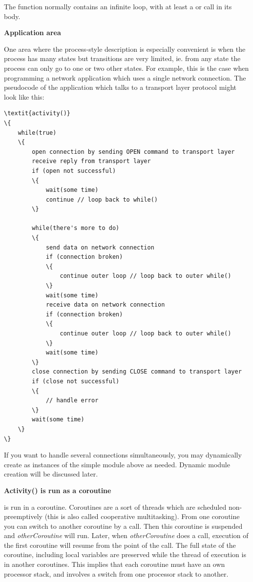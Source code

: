 The  function normally contains an infinite loop,
with at least a  or  call in its body.



\textbf{Application area}


One area where the process-style description is especially convenient is when the process has many
states but transitions are very limited, ie. from any state the
process can only go to one or two other states.  For example, this is
the case when programming a network application which uses a single
network connection.  The pseudocode of the application which talks to
a transport layer protocol might look like this:

\begin{Verbatim}[commandchars=\\\{\}]
\textit{activity()}
\{
    while(true)
    \{
        open connection by sending OPEN command to transport layer
        receive reply from transport layer
        if (open not successful)
        \{
            wait(some time)
            continue // loop back to while()
        \}

        while(there's more to do)
        \{
            send data on network connection
            if (connection broken)
            \{
                continue outer loop // loop back to outer while()
            \}
            wait(some time)
            receive data on network connection
            if (connection broken)
            \{
                continue outer loop // loop back to outer while()
            \}
            wait(some time)
        \}
        close connection by sending CLOSE command to transport layer
        if (close not successful)
        \{
            // handle error
        \}
        wait(some time)
    \}
\}
\end{Verbatim}



If you want to handle several connections simultaneously, you may
dynamically create as instances of the simple
module above as needed. Dynamic module creation will be discussed
later.


\textbf{Activity() is run as a coroutine}


 is run in a coroutine.
Coroutines are a sort of threads which are scheduled
non-preemptively (this is also called cooperative
multitasking). From one coroutine you
can switch to another coroutine by a
 call. Then this
coroutine is suspended and \textit{otherCoroutine} will run. Later,
when \textit{otherCoroutine} does a
 call, execution of
the first coroutine will resume from the point of the
 call.  The full state
of the coroutine, including local variables are preserved while the
thread of execution is in another coroutines.  This implies that each
coroutine must have an own processor stack, and
 involves a switch from one processor stack to
another.


